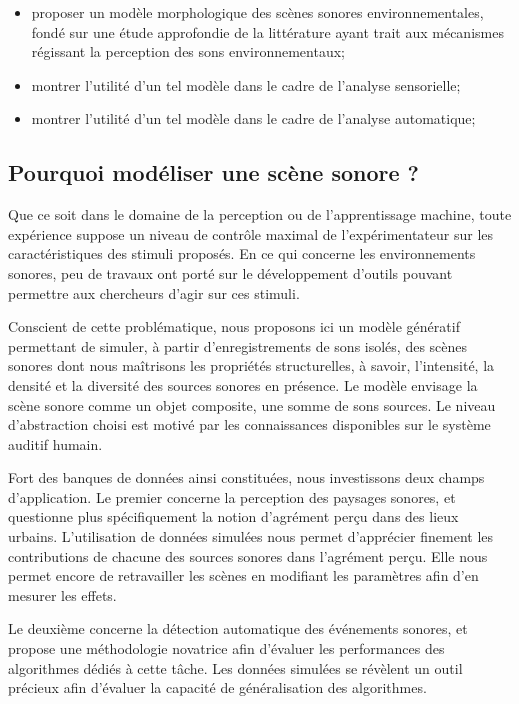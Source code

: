 \begin{itemize}
\item proposer un modèle morphologique des scènes sonores environnementales, fondé sur une étude approfondie de la littérature ayant trait aux mécanismes régissant la perception des sons environnementaux;
\item montrer l'utilité d'un tel modèle dans le cadre de l'analyse sensorielle;
\item montrer l'utilité d'un tel modèle dans le cadre de l'analyse automatique;
\end{itemize}

\subsection{Pourquoi modéliser une scène sonore ?}

Que ce soit dans le domaine de la perception ou de l'apprentissage machine, toute expérience suppose un niveau de contrôle maximal de l'expérimentateur sur les caractéristiques des stimuli proposés. En ce qui concerne les environnements sonores, peu de travaux ont porté sur le développement d’outils pouvant permettre aux chercheurs d'agir sur ces stimuli.

Conscient de cette problématique, nous proposons ici un modèle génératif permettant de simuler, à partir d'enregistrements de sons isolés, des scènes sonores dont nous maîtrisons les propriétés structurelles, à savoir, l'intensité, la densité et la diversité des sources sonores en présence. Le modèle envisage la scène sonore comme un objet composite, une somme de sons sources. Le niveau d'abstraction choisi est motivé par les connaissances disponibles sur le système auditif humain.

Fort des banques de données ainsi constituées, nous investissons deux champs d'application. Le premier concerne la perception des paysages sonores, et questionne plus spécifiquement la notion d'agrément perçu dans des lieux urbains. L'utilisation de données simulées nous permet d'apprécier finement les contributions de chacune des sources sonores dans l'agrément perçu. Elle nous permet encore de retravailler les scènes en modifiant les paramètres afin d'en mesurer les effets.

Le deuxième concerne la détection automatique des événements sonores, et propose une méthodologie novatrice afin d'évaluer les performances des algorithmes dédiés à cette tâche. Les données simulées se révèlent un outil précieux afin d'évaluer la capacité de généralisation des algorithmes.

